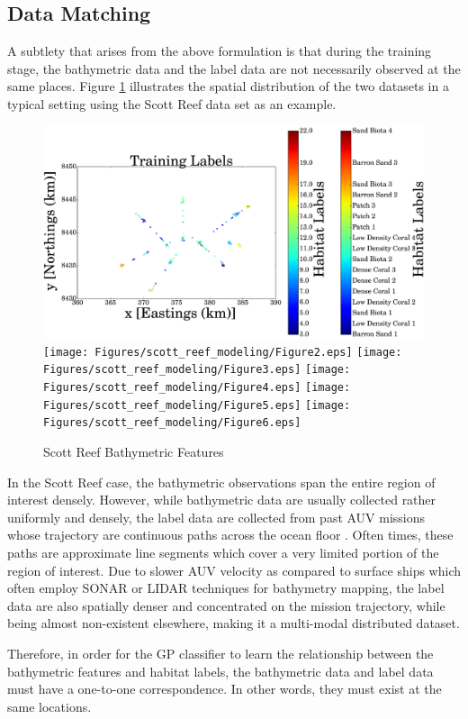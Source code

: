 		\subsection{Data Matching}
		\label{BenthicHabitatMapping:BathymetricFeatures:DataMatching}
		
			A subtlety that arises from the above formulation is that during the training stage, the bathymetric data and the label data are not necessarily observed at the same places. Figure \ref{Figure:ScottReefBathymetricFeatures} illustrates the spatial distribution of the two datasets in a typical setting using the Scott Reef data set \citep{IMOS} as an example.
		
			\begin{figure}[!htbp]
			\centering
				\includegraphics[width = 0.32\linewidth]{Figures/scott_reef_modeling/Figure1.eps}
				\texttt{[image: Figures/scott\_reef\_modeling/Figure2.eps]}
				\texttt{[image: Figures/scott\_reef\_modeling/Figure3.eps]}
				\texttt{[image: Figures/scott\_reef\_modeling/Figure4.eps]}
				\texttt{[image: Figures/scott\_reef\_modeling/Figure5.eps]}
				\texttt{[image: Figures/scott\_reef\_modeling/Figure6.eps]}
			\caption{Scott Reef Bathymetric Features}
			\label{Figure:ScottReefBathymetricFeatures}
			\end{figure}
			
			In the Scott Reef case, the bathymetric observations span the entire region of interest densely. However, while bathymetric data are usually collected rather uniformly and densely, the label data are collected from past AUV missions whose trajectory are continuous paths across the ocean floor \citep{Squidle}. Often times, these paths are approximate line segments which cover a very limited portion of the region of interest. Due to slower AUV velocity as compared to surface ships which often employ SONAR or LIDAR techniques for bathymetry mapping, the label data are also spatially denser and concentrated on the mission trajectory, while being almost non-existent elsewhere, making it a multi-modal distributed dataset. 
			
			Therefore, in order for the GP classifier to learn the relationship between the bathymetric features and habitat labels, the bathymetric data and label data must have a one-to-one correspondence. In other words, they must exist at the same locations. 
			
